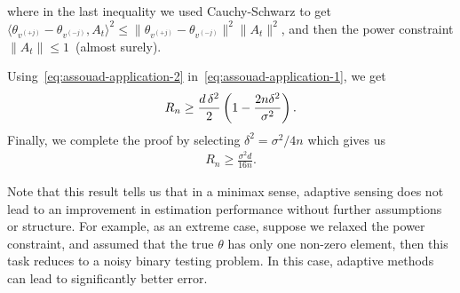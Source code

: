 \documentclass[12pt]{article}
\begin{document}
where in the last inequality we used Cauchy-Schwarz to get $\langle \theta_{v^{(+j)}} - \theta_{v^{(-j)}}, A_t \rangle^2 \leq \| \theta_{v^{(+j)}} - \theta_{v^{(-j)}}\|^2 \|A_t\|^2$, and then the power constraint $\|A_t\| \leq 1$~(almost surely). 

Using~\eqref{eq:assouad-application-2} in~\eqref{eq:assouad-application-1}, we get 
\begin{align}
R_n \geq \frac{d \, \delta^2}{2} \left( 1 - \frac{2 n \delta^2}{\sigma^2} \right). 
\end{align}
Finally, we complete the proof by selecting $\delta^2 = \sigma^2/4n$ which gives us 
\begin{align}
R_n \geq  \frac{\sigma^2 d}{16 n}. 
\end{align}

\begin{remark}
\label{remark:kl-bounding}
	Note that this result tells us that in a minimax sense, adaptive sensing does not lead to an improvement in estimation performance without further assumptions or structure.  For example, as an extreme case, suppose we relaxed the power constraint, and assumed that the true $\theta$ has only one non-zero element, then this task reduces to a noisy binary testing problem. In this case, adaptive methods can lead to significantly better error.
\end{remark}


\end{document}
